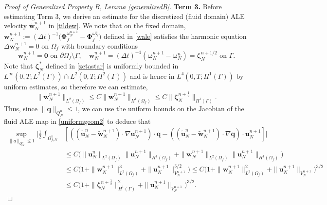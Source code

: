 \documentclass[11pt]{article}
\newcommand{\bd}{\boldsymbol}
\theoremstyle{definition}
\begin{document}
\begin{proof}[Proof of Generalized Property B, Lemma \ref{generalizedB}]
\medskip

\noindent \textbf{Term 3.} Before estimating Term 3, we derive an estimate for the discretized (fluid domain) ALE velocity $\tilde{\bd{w}}^{n + 1}_{N}$ in \eqref{tildew}. We note that on the fixed domain, $\bd{w}^{n + 1}_{N} := (\Delta t)^{-1}\Big(\bd{\Phi}^{\omega^{n + 1}_{N}}_{f} - \bd{\Phi}^{\omega^{n}_{N}}_{f}\Big)$ defined in \eqref{wale} satisfies the harmonic equation $\Delta \bd{w}^{n + 1}_{N} = 0$ on $\Omega_{f}$
with boundary conditions
\begin{equation*}
\bd{w}^{n + 1}_{N} = \bd{0} \text{ on } \partial \Omega_{f} \setminus \Gamma, \quad \bd{w}^{n + 1}_{N} = (\Delta t)^{-1}(\bd{\omega}^{n + 1}_{N} - \bd{\omega}^{n}_{N}) = \bd{\zeta}^{n + 1/2}_{N} \text{ on } \Gamma.
\end{equation*}
Note that $\bd{\zeta}^{*}_{N}$ defined in \eqref{zetastar} is uniformly bounded in $L^{\infty}(0, T; L^{2}(\Gamma)) \cap L^{2}(0, T; H^{2}(\Gamma))$ and is hence in $L^{4}(0, T; H^{1}(\Gamma))$ by uniform estimates, so therefore we can estimate,
\begin{equation*}
\|\bd{w}^{n + 1}_{N}\|_{L^{2}(\Omega_{f})} \le C\|\bd{w}^{n + 1}_{N}\|_{H^{1}(\Omega_{f})} \le C\|\bd{\zeta}^{n + \frac{1}{2}}_{N}\|_{H^{1}(\Gamma)}.
\end{equation*}
Thus, since $\|\bd{q}\|_{Q^{n}_{N}} \le 1$, we can use the uniform bounds on the Jacobian of the fluid ALE map in \eqref{uniformgeom2} to deduce that
\begin{align*}
\sup_{\|q\|_{Q^{n}_{N}} \le 1} \Bigg|\frac{1}{2} \int_{\Omega^{n}_{f, N}} &[((\tilde{\bd{u}}^{n}_{N} - \tilde{\bd{w}}^{n + 1}_{N}) \cdot \nabla \bd{u}^{n + 1}_{N}) \cdot \bd{q} - ((\tilde{\bd{u}}^{n}_{N} - \tilde{\bd{w}}^{n + 1}_{N}) \cdot \nabla \bd{q}) \cdot \bd{u}^{n + 1}_{N}]\Bigg| \\
&\le C\Big(\|\bd{u}^{n}_{N}\|_{L^{2}(\Omega_{f})} \|\bd{u}^{n + 1}_{N}\|_{H^{1}(\Omega_{f})} + \|\bd{w}^{n + 1}_{N}\|_{L^{2}(\Omega_{f})} \|\bd{u}^{n + 1}_{N}\|_{H^{1}(\Omega_{f})}\Big) \\
&\le C\Big(1 + \|\bd{w}^{n + 1}_{N}\|_{L^{2}(\Omega_{f})}^{3} + \|\bd{u}^{n + 1}_{N}\|_{V^{n + 1}_{N}}^{3/2}\Big) \le C\Big(1 + \|\bd{w}^{n + 1}_{N}\|_{L^{2}(\Omega_{f})}^{2} + \|\bd{u}^{n + 1}_{N}\|_{V^{n + 1}_{N}}\Big)^{3/2} \\
&\le C\Big(1 + \|\bd{\zeta}^{n + \frac{1}{2}}_{N}\|_{H^{1}(\Gamma)}^{2} + \|\bd{u}^{n + 1}_{N}\|_{V^{n + 1}_{N}}\Big)^{3/2}.
\end{align*}

\medskip


\end{proof}
\end{document}
